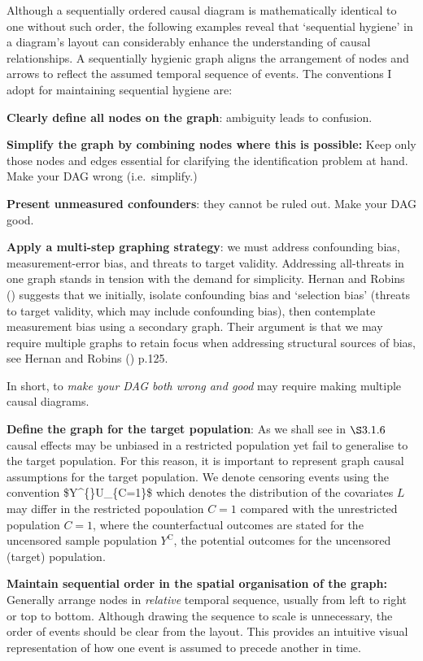 \documentclass[
  singlecolumn]{article}
\begin{document}
Although a sequentially ordered causal diagram is mathematically
identical to one without such order, the following examples reveal that
`sequential hygiene' in a diagram's layout can considerably enhance the
understanding of causal relationships. A sequentially hygienic graph
aligns the arrangement of nodes and arrows to reflect the assumed
temporal sequence of events. The conventions I adopt for maintaining
sequential hygiene are:

\textbf{Clearly define all nodes on the graph}: ambiguity leads to
confusion.

\textbf{Simplify the graph by combining nodes where this is possible:}
Keep only those nodes and edges essential for clarifying the
identification problem at hand. Make your DAG wrong (i.e.~simplify.)

\textbf{Present unmeasured confounders}: they cannot be ruled out. Make
your DAG good.

\textbf{Apply a multi-step graphing strategy}: we must address
confounding bias, measurement-error bias, and threats to target
validity. Addressing all-threats in one graph stands in tension with the
demand for simplicity. Hernan and Robins
() suggests that we initially, isolate
confounding bias and `selection bias' (threats to target validity, which
may include confounding bias), then contemplate measurement bias using a
secondary graph. Their argument is that we may require multiple graphs
to retain focus when addressing structural sources of bias, see Hernan
and Robins () p.125.

In short, to \emph{make your DAG both wrong and good} may require making
multiple causal diagrams.

\textbf{Define the graph for the target population}: As we shall see in
\(\S 3.1.6\) causal effects may be unbiased in a restricted population
yet fail to generalise to the target population. For this reason, it is
important to represent graph causal assumptions for the target
population. We denote censoring events using the convention
\$Y\^{}\{\}\leftarrowblue U\_\{C=1\}\rightarrowblue \$ which
denotes the distribution of the covariates \(L\) may differ in the
restricted popoulation \(C=1\) compared with the unrestricted population
\(C = 1\), where the counterfactual outcomes are stated for the
uncensored sample population \(Y^{\text{C}}\), the potential outcomes
for the uncensored (target) population.

\textbf{Maintain sequential order in the spatial organisation of the
graph:} Generally arrange nodes in \emph{relative} temporal sequence,
usually from left to right or top to bottom. Although drawing the
sequence to scale is unnecessary, the order of events should be clear
from the layout. This provides an intuitive visual representation of how
one event is assumed to precede another in time.
\end{document}

